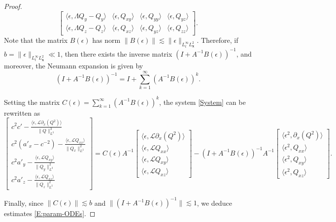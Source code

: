 \documentclass[12pt,letterpaper]{amsart}
\newcommand{\la}{\langle}
\newcommand{\ra}{\rangle}
\theoremstyle{remark}
\numberwithin{equation}{section}
\numberwithin{theorem}{section}
\numberwithin{table}{section}
\begin{document}
\begin{proof}
$$\begin{bmatrix}
\la \epsilon, \Lambda Q_{y} - Q_{y}\ra & \la \epsilon, Q_{xy}\ra  &  \la \epsilon, Q_{yy}\ra & \la \epsilon, Q_{yz}\ra\\
\la \epsilon, \Lambda Q_{z} - Q_{z}\ra & \la \epsilon, Q_{xz}\ra  &  \la \epsilon, Q_{yz}\ra & \la \epsilon, Q_{zz}\ra 
\end{bmatrix}.
$$
Note that the matrix $B(\epsilon)$ has norm $\|B(\epsilon)\|\lesssim \| \epsilon \|_{L_t^\infty L_{\mathbf{x}}^2}$. Therefore, if $b= \| \epsilon \|_{L_t^\infty L_{\mathbf{x}}^2} \ll 1$, then there exists the inverse matrix $(I+A^{-1}B(\epsilon))^{-1}$, and moreover, the Neumann expansion is given by
$$
(I+A^{-1}B(\epsilon))^{-1}=I+\sum_{k=1}^{\infty}(A^{-1}B(\epsilon))^k.
$$

Setting the matrix $C(\epsilon)=\sum_{k=1}^{\infty}(A^{-1}B(\epsilon))^k$, the system \eqref{System} can be rewritten as 
$$
\begin{bmatrix} 
c^2c' - \frac{\la \epsilon, \mathcal{L} \partial_x (Q^2)\ra}{ \|Q\|_{L^3}^3} \\ 
c^2(a'_{x} -c^{-2}) - \frac{ \la \epsilon, \mathcal{L} Q_{xx}\ra }{ \|Q_{x}\|_{L^2}^2 }  \\ 
c^2a'_{y} - \frac{ \la \epsilon, \mathcal{L} Q_{xy}\ra }{ \|Q_{y}\|_{L^2}^2 }\\
c^2a'_{z}- \frac{ \la \epsilon, \mathcal{L} Q_{xz}\ra }{ \|Q_{z}\|_{L^2}^2 }  
\end{bmatrix} 
=  C(\epsilon)A^{-1}\begin{bmatrix} \la \epsilon, \mathcal{L} \partial_{x} (Q^2)\ra \\ 
\la \epsilon, \mathcal{L}  Q_{xx}\ra \\ 
\la \epsilon, \mathcal{L}  Q_{xy}\ra \\
\la \epsilon, \mathcal{L}  Q_{xz}\ra 
\end{bmatrix} 
- (I+A^{-1}B(\epsilon))^{-1}A^{-1}\begin{bmatrix} \la \epsilon^2, \partial_{x}(Q^2)\ra \\ 
\la \epsilon^2, Q_{xx}\ra \\ 
\la \epsilon^2, Q_{xy}\ra \\
\la \epsilon^2, Q_{xz}\ra  
\end{bmatrix}.
$$

Finally, since $\|C(\epsilon)\|\lesssim b$ and $\|(I+A^{-1}B(\epsilon))^{-1}\|\lesssim 1$, we deduce estimates \eqref{E:param-ODEs}.
\end{proof}

\end{document}
